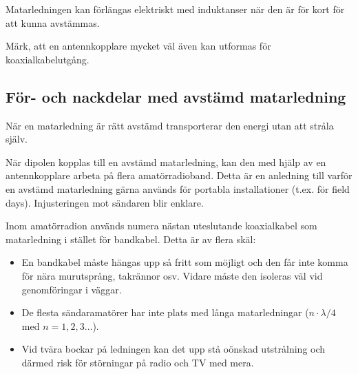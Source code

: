 Matarledningen kan förlängas elektriskt med induktanser när den är för
kort för att kunna avstämmas.

Märk, att en antennkopplare mycket väl även kan utformas för
koaxialkabelutgång.

\subsection{För- och nackdelar med avstämd matarledning}

När en matarledning är rätt avstämd transporterar den energi utan att
stråla själv.

När dipolen kopplas till en avstämd matarledning, kan den med hjälp av
en antennkopplare arbeta på flera amatörradioband.
Detta är en anledning till varför en avstämd matarledning gärna används för
portabla installationer (t.ex. för field days).
Injusteringen mot sändaren blir enklare.

Inom amatörradion används numera nästan uteslutande koaxialkabel som
matarledning i stället för bandkabel.
Detta är av flera skäl:

\begin{itemize}
\item En bandkabel måste hängas upp så fritt som möjligt och den får
  inte komma för nära murutsprång, takrännor osv.
  Vidare måste den isoleras väl vid genomföringar i väggar.

\item De flesta sändaramatörer har inte plats med långa matarledningar
  (\(n\cdot\lambda/4\) med \(n = 1, 2, 3 \dots\)).

\item Vid tvära bockar på ledningen kan det upp stå oönskad
  utstrålning och därmed risk för störningar på radio och TV med mera.
\end{itemize}


